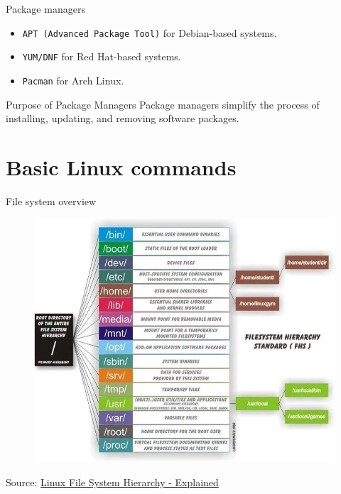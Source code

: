 \documentclass{beamer}
\begin{document}
\begin{frame}{Package managers}
  \begin{itemize}
    \item \texttt{APT (Advanced Package Tool)} for Debian-based systems.
    \item \texttt{YUM/DNF} for Red Hat-based systems.
    \item \texttt{Pacman} for Arch Linux.
  \end{itemize}
  \begin{block}{Purpose of Package Managers}
    Package managers simplify the process of installing, updating, and removing software packages.
  \end{block}
\end{frame}

\section{Basic Linux commands}

\begin{frame}{File system overview}
  \begin{figure}[h]
    \includegraphics[height=0.81\textheight]{images/linux-fs.png}
  \end{figure}

  \footnotesize Source: \href{https://blog.fourninecloud.com/linux-file-system-hierarchy-explained-1d80b2cee03c}{Linux File System Hierarchy - Explained}
\end{frame}
\end{document}
